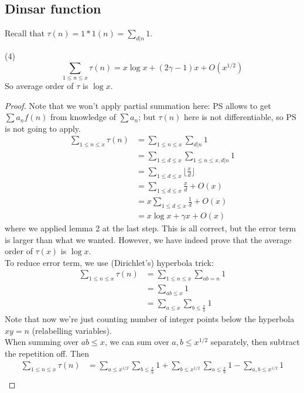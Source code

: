 \documentclass[a4paper]{article}
\begin{document}
\subsection{Dinsar function}
Recall that $\tau(n) = 1*1(n) =\sum_{d|n} 1$.

\begin{thm} (4)\\
$$\sum_{1 \leq n \leq x} \tau(n) = x\log x + (2\gamma - 1) x + O(x^{1/2})$$
So average order of $\tau$ is $\log x$.
\begin{proof}
Note that we won't apply partial summation here: PS allows to get $\sum a_n f(n)$ from knowledge of $\sum a_n$; but $\tau(n)$ here is not differentiable, so PS is not going to apply.
\begin{equation*}
\begin{aligned}
\sum_{1 \leq n \leq x} \tau(n) &= \sum_{1 \leq n \leq x} \sum_{d|n} 1\\
&= \sum_{1 \leq d \leq x} \sum_{1 \leq n \leq x, d|n} 1\\
&= \sum_{1 \leq d \leq x} \lfloor \frac{x}{d} \rfloor\\
&= \sum_{1 \leq d \leq x} \frac{x}{d} + O(x)\\
&= x \sum_{1 \leq d \leq x} \frac{1}{d} + O(x)\\
&= x\log x + \gamma x + O(x) 
\end{aligned}
\end{equation*}
where we applied lemma 2 at the last step. This is all correct, but the error term is larger than what we wanted. However, we have indeed prove that the average order of $\tau(x)$ is $\log x$.\\
To reduce error term, we use (Dirichlet's) hyperbola trick:
\begin{equation*}
\begin{aligned}
\sum_{1 \leq n \leq x} \tau(n) &= \sum_{1 \leq n \leq x} \sum_{ab = n} 1\\
&= \sum_{ab \leq x} 1\\
&= \sum_{a \leq x} \sum_{b \leq \frac{x}{a}} 1
\end{aligned}
\end{equation*}
Note that now we're just counting number of integer points below the hyperbola $xy=n$ (relabelling variables).\\
When summing over $ab \leq x$, we can sum over $a,b \leq x^{1/2}$ separately, then subtract the repetition off. Then
\begin{equation*}
\begin{aligned}
\sum_{1 \leq n \leq x} \tau (n) &= \sum_{a \leq x^{1/2}}\sum_{b \leq \frac{x}{a}} 1 + \sum_{b \leq x^{1/2}} \sum_{a \leq \frac{x}{b}} 1 - \sum_{a,b \leq x^{1/2}} 1\\

\end{aligned}
\end{equation*}
\end{proof}
\end{thm}
\end{document}

